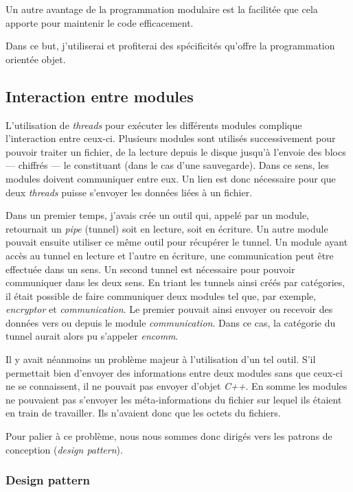 \documentclass[a4paper,10pt, twoside]{report}
\begin{document}
\begin{spacing}{1.2}
Un autre avantage de la programmation modulaire est la facilitée que cela
apporte pour maintenir le code efficacement.

Dans ce but, j'utiliserai et profiterai des spécificités qu'offre la
programmation orientée objet.

\subsection{Interaction entre modules}

L'utilisation de \textit{threads} pour exécuter les différents modules
complique l'interaction entre ceux-ci. Plusieurs modules sont utilisés
successivement pour pouvoir traiter un fichier, de la lecture depuis le disque
jusqu'à l'envoie des blocs --- chiffrés --- le constituant (dans le cas
d'une sauvegarde). Dans ce sens, les modules doivent communiquer entre eux. Un
lien est donc nécessaire pour que deux \textit{threads} puisse s'envoyer les
données liées à un fichier.

Dans un premier temps, j'avais crée un outil qui, appelé par un module,
retournait un \textit{pipe} (tunnel) soit en lecture, soit en écriture. Un
autre module pouvait ensuite utiliser ce même outil pour récupérer le tunnel.
Un module ayant accès au tunnel en lecture et l'autre en écriture, une
communication peut être effectuée dans un sens. Un second tunnel est
nécessaire pour pouvoir communiquer dans les deux sens. En triant les
tunnels ainsi créés par catégories, il était possible de faire
communiquer deux modules tel que, par exemple, \textit{encryptor} et
\textit{communication}. Le premier pouvait ainsi envoyer ou recevoir des
données vers ou depuis le module \textit{communication}. Dans ce cas, la
catégorie du tunnel aurait alors pu s'appeler \textit{encomm}.

Il y avait néanmoins un problème majeur à l'utilisation d'un tel outil.
S'il permettait bien d'envoyer des informations entre deux modules sans
que ceux-ci ne se connaissent, il ne pouvait pas envoyer d'objet
\textit{C++}. En somme les modules ne pouvaient pas s'envoyer les méta-informations
du fichier sur lequel ils étaient en train de travailler. Ils n'avaient
donc que les octets du fichiers.

Pour palier à ce problème, nous nous sommes donc dirigés vers les patrons
de conception (\textit{design pattern}).

\subsubsection{Design pattern}

\end{spacing}
\end{document}
